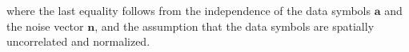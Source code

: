 where the last equality follows from the independence of the data symbols $\mathbf{a}$ and the noise vector $\mathbf{n}$, and the assumption that the data symbols are spatially uncorrelated and normalized.

